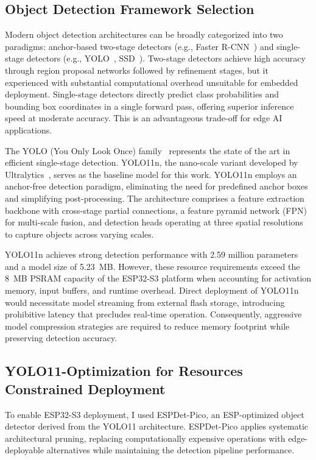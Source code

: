\subsection{Object Detection Framework Selection}

Modern object detection architectures can be broadly categorized into two paradigms: anchor-based two-stage detectors (e.g., Faster R-CNN~\cite{ren2015faster}) and single-stage detectors (e.g., YOLO~\cite{redmon2016you}, SSD~\cite{liu2016ssd}). Two-stage detectors achieve high accuracy through region proposal networks followed by refinement stages, but it experienced with substantial computational overhead unsuitable for embedded deployment. Single-stage detectors directly predict class probabilities and bounding box coordinates in a single forward pass, offering superior inference speed at moderate accuracy. This is an advantageous trade-off for edge AI applications.

The YOLO (You Only Look Once) family~\cite{yolo11_ultralytics} represents the state of the art in efficient single-stage detection. YOLO11n, the nano-scale variant developed by Ultralytics~\cite{yolo11_ultralytics}, serves as the baseline model for this work. YOLO11n employs an anchor-free detection paradigm, eliminating the need for predefined anchor boxes and simplifying post-processing. The architecture comprises a feature extraction backbone with cross-stage partial connections, a feature pyramid network (FPN)~\cite{lin2017feature} for multi-scale fusion, and detection heads operating at three spatial resolutions to capture objects across varying scales.

YOLO11n achieves strong detection performance with 2.59 million parameters and a model size of 5.23~MB. However, these resource requirements exceed the 8~MB PSRAM capacity of the ESP32-S3 platform when accounting for activation memory, input buffers, and runtime overhead. Direct deployment of YOLO11n would necessitate model streaming from external flash storage, introducing prohibitive latency that precludes real-time operation. Consequently, aggressive model compression strategies are required to reduce memory footprint while preserving detection accuracy.

\subsection{YOLO11-Optimization for Resources Constrained Deployment}

To enable ESP32-S3 deployment, I used ESPDet-Pico, an ESP-optimized object detector derived from the YOLO11 architecture. ESPDet-Pico applies systematic architectural pruning, replacing computationally expensive operations with edge-deployable alternatives while maintaining the detection pipeline performance.

